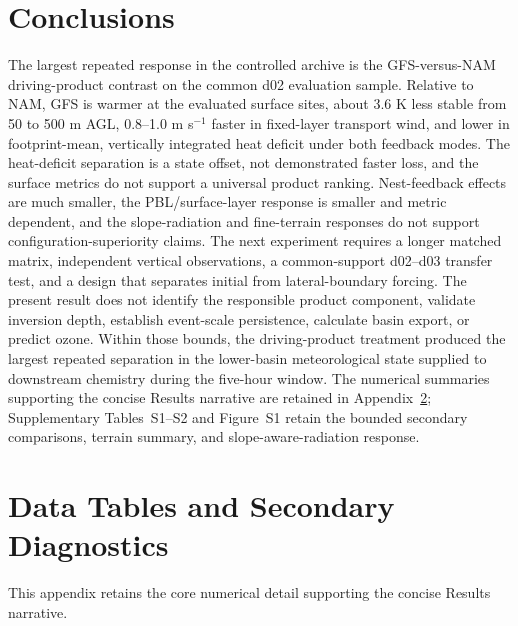 \documentclass[air,article,submit,moreauthors]{Definitions/mdpi}
\begin{document}
\section{Conclusions}
\label{sec:v3-conclusions}

The largest repeated response in the controlled archive is the GFS-versus-NAM driving-product contrast on the common d02 evaluation sample.
Relative to NAM, GFS is warmer at the evaluated surface sites, about 3.6 K less stable from 50 to 500 m AGL, 0.8--1.0 m s$^{-1}$ faster in fixed-layer transport wind, and lower in footprint-mean, vertically integrated heat deficit under both feedback modes.
The heat-deficit separation is a state offset, not demonstrated faster loss, and the surface metrics do not support a universal product ranking.
Nest-feedback effects are much smaller, the PBL/surface-layer response is smaller and metric dependent, and the slope-radiation and fine-terrain responses do not support configuration-superiority claims.
The next experiment requires a longer matched matrix, independent vertical observations, a common-support d02--d03 transfer test, and a design that separates initial from lateral-boundary forcing.
The present result does not identify the responsible product component, validate inversion depth, establish event-scale persistence, calculate basin export, or predict ozone.
Within those bounds, the driving-product treatment produced the largest repeated separation in the lower-basin meteorological state supplied to downstream chemistry during the five-hour window.
The numerical summaries supporting the concise Results narrative are retained in Appendix~\ref{app:v3-data}; Supplementary Tables~S1--S2 and Figure~S1 retain the bounded secondary comparisons, terrain summary, and slope-aware-radiation response.

\appendixstart
\appendix
\section{Data Tables and Secondary Diagnostics}
\label{app:v3-data}

This appendix retains the core numerical detail supporting the concise Results narrative.
\end{document}
